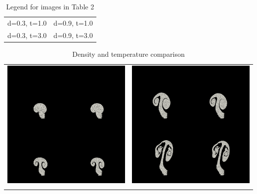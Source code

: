 \documentclass[a4paper,11pt]{article}
\theoremstyle{mytheor}
\begin{document}
\begin{table}[H]
\caption{Legend for images in Table 2}
\centering
\begin{tabular}{cc}
d=0.3, t=1.0 & d=0.9, t=1.0\\
\newline
d=0.3, t=3.0 & d=0.9, t=3.0\\
\end{tabular}
\end{table}

\begin{table}[H]
\caption{Density and temperature comparison}
\centering
\begin{tabular}{cc}
\includegraphics[width=70mm]{comp_60.png} &\includegraphics[width=70mm]{comp_120.png}\\
\newline

\end{tabular}
\end{table}
\end{document}
